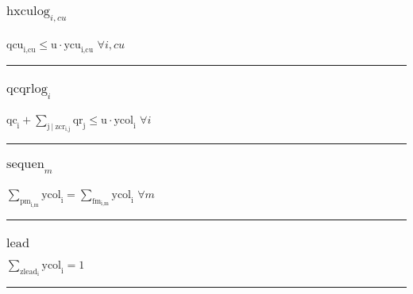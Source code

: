 \documentclass[11pt]{article}
\begin{document}
\subsubsection*{\begin{math}\text{hxculog}_{i,cu}\end{math}}
\begin{math}
\text{qcu}_{\text{i},\text{cu}} \leq \text{u} \cdot \text{ycu}_{\text{i},\text{cu}}
\end{math}
\hfill
\begin{math}
\forall i,cu
\end{math}\vspace{5pt}
\hrule
\subsubsection*{\begin{math}\text{qcqrlog}_{i}\end{math}}
\begin{math}
\text{qc}_{\text{i}} + \displaystyle \sum_{\text{j} ~ | ~ \text{zcr}_{\text{i},\text{j}}} \text{qr}_{\text{j}} \leq \text{u} \cdot \text{ycol}_{\text{i}}
\end{math}
\hfill
\begin{math}
\forall i
\end{math}\vspace{5pt}
\hrule
\subsubsection*{\begin{math}\text{sequen}_{m}\end{math}}
\begin{math}
\displaystyle \sum_{\text{pm}_{\text{i},\text{m}}} \text{ycol}_{\text{i}} = \displaystyle \sum_{\text{fm}_{\text{i},\text{m}}} \text{ycol}_{\text{i}}
\end{math}
\hfill
\begin{math}
\forall m
\end{math}\vspace{5pt}
\hrule
\subsubsection*{\begin{math}\text{lead}\end{math}}
\begin{math}
\displaystyle \sum_{\text{zlead}_{\text{i}}} \text{ycol}_{\text{i}} = 1
\end{math}
\vspace{5pt}
\hrule
\end{document}
